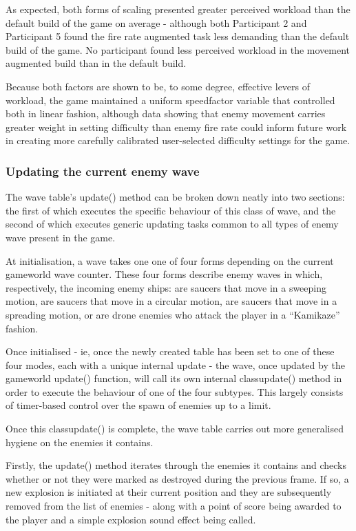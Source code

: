 \documentclass[11pt]{article}
\begin{document}
As expected, both forms of scaling presented greater perceived workload than the default build of
the game on average - although both Participant 2 and Participant 5 found the fire rate augmented
task less demanding than the default build of the game. No participant found less perceived
workload in the movement augmented build than in the default build.

Because both factors are shown to be, to some degree, effective levers of workload, the game
maintained a uniform speed\textunderscore factor variable that controlled both in linear fashion,
although data showing that enemy movement carries greater weight in setting difficulty than enemy
fire rate could inform future work in creating more carefully calibrated user-selected difficulty
settings for the game.

\subsubsection*{Updating the current enemy wave}

The wave table's update() method can be broken down neatly into two sections: the first
of which executes the specific behaviour of this class of wave, and the second of
which executes generic updating tasks common to all types of enemy wave present in
the game.

At initialisation, a wave takes one one of four forms depending on the current
game\textunderscore world wave counter. These four forms describe enemy waves in which,
respectively, the incoming enemy ships: are saucers that move in a sweeping motion,
are saucers that move in a circular motion, are saucers that move in a spreading motion,
or are drone enemies who attack the player in a ``Kamikaze'' fashion.

Once initialised - ie, once the newly created table has been set to one of these
four modes, each with a unique internal update - the wave, once updated by the
game\textunderscore world update() function, will call its own internal
class\textunderscore update() method in order to execute the behaviour of one of
the four subtypes. This largely consists of timer-based control over the spawn of
enemies up to a limit.

Once this class\textunderscore update() is complete, the wave table carries out
more generalised hygiene on the enemies it contains.

Firstly, the update() method iterates through the enemies it contains and
checks whether or not they were marked as destroyed during the previous frame.
If so, a new explosion is initiated at their current position and they are
subsequently removed from the list of enemies - along with a point of score being
awarded to the player and a simple explosion sound effect being called.
\end{document}
